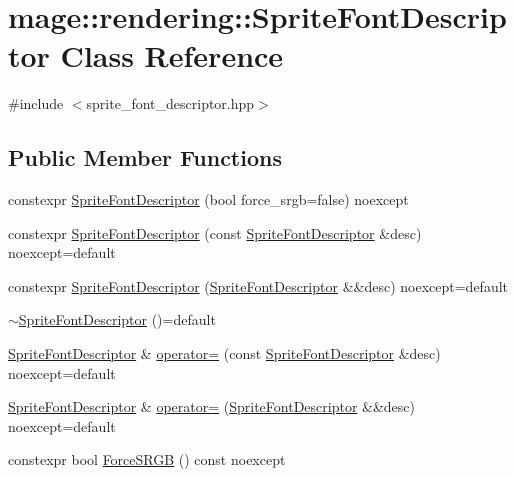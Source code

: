 \hypertarget{classmage_1_1rendering_1_1_sprite_font_descriptor}{}\section{mage\+:\+:rendering\+:\+:Sprite\+Font\+Descriptor Class Reference}
\label{classmage_1_1rendering_1_1_sprite_font_descriptor}


{\ttfamily \#include $<$sprite\+\_\+font\+\_\+descriptor.\+hpp$>$}

\subsection*{Public Member Functions}
\begin{DoxyCompactItemize}
\item 
constexpr \mbox{\hyperlink{classmage_1_1rendering_1_1_sprite_font_descriptor_a82c66afe6cc815ad223c15642cd2ac00}{Sprite\+Font\+Descriptor}} (bool force\+\_\+srgb=false) noexcept
\item 
constexpr \mbox{\hyperlink{classmage_1_1rendering_1_1_sprite_font_descriptor_a168e12be8a7029e5f5dcffe058100bd6}{Sprite\+Font\+Descriptor}} (const \mbox{\hyperlink{classmage_1_1rendering_1_1_sprite_font_descriptor}{Sprite\+Font\+Descriptor}} \&desc) noexcept=default
\item 
constexpr \mbox{\hyperlink{classmage_1_1rendering_1_1_sprite_font_descriptor_a1a84c848b090000d444fdade6ca171e2}{Sprite\+Font\+Descriptor}} (\mbox{\hyperlink{classmage_1_1rendering_1_1_sprite_font_descriptor}{Sprite\+Font\+Descriptor}} \&\&desc) noexcept=default
\item 
\mbox{\hyperlink{classmage_1_1rendering_1_1_sprite_font_descriptor_adef19c1e38ed5a685578a855b17c08bc}{$\sim$\+Sprite\+Font\+Descriptor}} ()=default
\item 
\mbox{\hyperlink{classmage_1_1rendering_1_1_sprite_font_descriptor}{Sprite\+Font\+Descriptor}} \& \mbox{\hyperlink{classmage_1_1rendering_1_1_sprite_font_descriptor_ab486bf77ca702ecd2f9c34a43206b2e3}{operator=}} (const \mbox{\hyperlink{classmage_1_1rendering_1_1_sprite_font_descriptor}{Sprite\+Font\+Descriptor}} \&desc) noexcept=default
\item 
\mbox{\hyperlink{classmage_1_1rendering_1_1_sprite_font_descriptor}{Sprite\+Font\+Descriptor}} \& \mbox{\hyperlink{classmage_1_1rendering_1_1_sprite_font_descriptor_a49a53f458d277278389c62f5aaba3c59}{operator=}} (\mbox{\hyperlink{classmage_1_1rendering_1_1_sprite_font_descriptor}{Sprite\+Font\+Descriptor}} \&\&desc) noexcept=default
\item 
constexpr bool \mbox{\hyperlink{classmage_1_1rendering_1_1_sprite_font_descriptor_a3cb658ac0be4024493b2917be5e0d96d}{Force\+S\+R\+GB}} () const noexcept
\end{DoxyCompactItemize}
